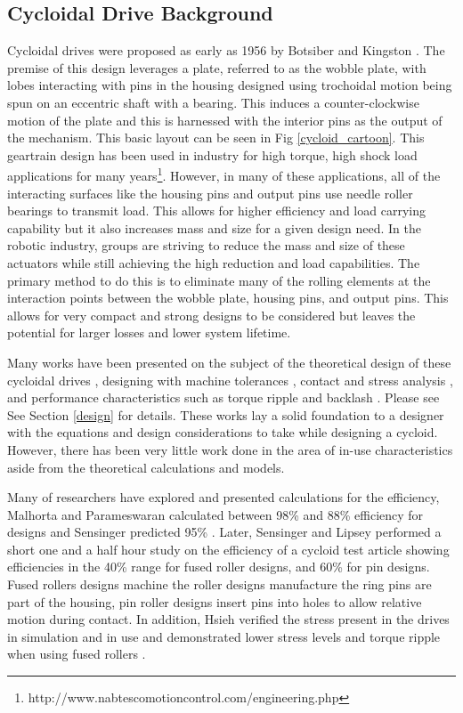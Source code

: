\subsection{Cycloidal Drive Background}
Cycloidal drives were proposed as early as 1956 by Botsiber and Kingston \cite{1956}. The premise of this design leverages a plate, referred to as the wobble plate, with lobes interacting with pins in the housing designed using trochoidal motion being spun on an eccentric shaft with a bearing. This induces a counter-clockwise motion of the plate and this is harnessed with the interior pins as the output of the mechanism. This basic layout can be seen in Fig \ref{cycloid_cartoon}. This geartrain design has been used in industry for high torque, high shock load applications for many years\footnote{http://www.nabtescomotioncontrol.com/engineering.php}. However, in many of these applications, all of the interacting surfaces like the housing pins and output pins use needle roller bearings to transmit load. This allows for higher efficiency and load carrying capability but it also increases mass and size for a given design need. In the robotic industry, groups are striving to reduce the mass and size of these actuators while still achieving the high reduction and load capabilities. The primary method to do this is to eliminate many of the rolling elements at the interaction points between the wobble plate, housing pins, and output pins. This allows for very compact and strong designs to be considered but leaves the potential for larger losses and lower system lifetime. 

Many works have been presented on the subject of the theoretical design of these cycloidal drives \cite{on_the_lobe} \cite{hwang_hsieh}, designing with machine tolerances \cite{design_and_application}, contact and stress analysis \cite{li}, and performance characteristics such as torque ripple and backlash \cite{hsieh_traditional} \cite{hsieh_dynamics}. Please see See Section \ref{design} for details. These works lay a solid foundation to a designer with the equations and design considerations to take while designing a cycloid. However, there has been very little work done in the area of in-use characteristics aside from the theoretical calculations and models. 

Many of researchers have explored and presented calculations for the efficiency, Malhorta and Parameswaran calculated between 98\% and 88\% efficiency for designs \cite{Malhorta} and Sensinger predicted 95\% \cite{unified_approach}. Later, Sensinger and Lipsey performed a short one and a half hour study on the efficiency of a cycloid test article \cite{cycloid_vs_harmonic} showing efficiencies in the 40\% range for fused roller designs, and 60\% for pin designs. Fused rollers designs machine the roller designs manufacture the ring pins are part of the housing, pin roller designs insert pins into holes to allow relative motion during contact. In addition, Hsieh verified the stress present in the drives in simulation and in use and demonstrated lower stress levels and torque ripple when using fused rollers \cite{hsieh_dynamics}. 

